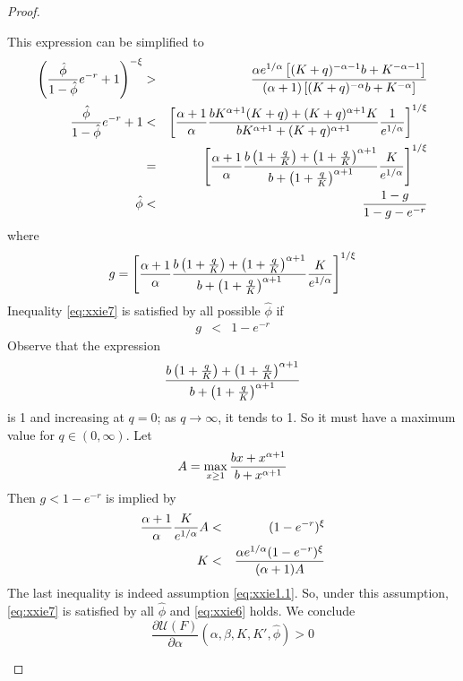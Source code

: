\documentclass{article}
\newcommand{\pd}[2]{
  \frac{\partial #1}{\partial #2}
}
\newcommand{\1}[1]{
  \mathbf{1}_{\{#1\}}
}
\begin{document}
\begin{proof}
\begin{enumerate}[i.]
    This expression can be simplified to
    \begin{eqnarray}
      \left(
           {\hat\phi \over 1 - \hat\phi} e^{-r} + 1
      \right)^{-\xi} &>&
      {
        \alpha e^{1/\alpha} \left[
          (K + q)^{-\alpha - 1} b + K^{-\alpha - 1}
        \right]
        \over
        (\alpha + 1) \left[
          (K + q)^{-\alpha} b + K^{-\alpha}
        \right]
      } \nonumber \\
      {\hat\phi \over 1 - \hat\phi}e^{-r} + 1
      &<&
      \left[
        {\alpha + 1 \over \alpha}
        {
          b K^{\alpha + 1} (K + q)
          + (K + q)^{\alpha + 1} K 
          \over
          b K^{\alpha + 1} + (K + q)^{\alpha + 1}
        } {
          1
          \over
          e^{1/\alpha}
        }
     \right]^{1/\xi} \nonumber \\
      &=&
      \left[
        {\alpha + 1 \over \alpha}
        {
          b \left(1 + {q \over K}\right)
          + \left(1 + {q \over K}\right)^{\alpha + 1}
          \over
          b + \left(1 + {q \over K}\right)^{\alpha + 1}
        } {
          K
          \over
          e^{1/\alpha}
        }
      \right]^{1/\xi} \nonumber \\
      \hat\phi &<& {1 - g \over 1 - g - e^{-r}}
      \label{eq:xxie7}
    \end{eqnarray}
    where
    \[
    g = 
    \left[
      {\alpha + 1 \over \alpha}
      {
        b \left(1 + {q \over K}\right)
        + \left(1 + {q \over K}\right)^{\alpha + 1}
        \over
        b + \left(1 + {q \over K}\right)^{\alpha + 1}
      } {
        K
        \over
        e^{1/\alpha}
      }
      \right]^{1/\xi}
    \]
    Inequality \eqref{eq:xxie7} is satisfied by all possible
    $\hat\phi$ if
    \begin{eqnarray*}
      g &<& 1 - e^{-r}
    \end{eqnarray*}
    Observe that the expression
    \[
    {
      b \left(1 + {q \over K}\right)
      + \left(1 + {q \over K}\right)^{\alpha + 1}
      \over
      b + \left(1 + {q \over K}\right)^{\alpha + 1}
    }
    \]
    is 1 and increasing at $q = 0$; as $q \to \infty$, it tends to
    1. So it must have a maximum value for
    $q \in (0, \infty)$. Let
    \[
    A = \max_{x \geq 1} {b x + x^{\alpha + 1} \over b + x^{\alpha + 1}}
    \]
    Then $g < 1 - e^{-r}$ is implied by
    \begin{eqnarray*}
      {\alpha + 1 \over \alpha}
      {K \over e^{1/\alpha}}
      A &<& (1 - e^{-r})^\xi \\
      K &<& {
        \alpha e^{1/\alpha} (1 - e^{-r})^\xi
        \over
        (\alpha + 1) A
      }
    \end{eqnarray*}
    The last inequality is indeed assumption \eqref{eq:xxie1.1}.
    So, under this assumption, \eqref{eq:xxie7} is satisfied by all
    $\hat\phi$ and \eqref{eq:xxie6} holds. We conclude
    \[
    \pd{\mathcal U(F)}{\alpha}(\alpha, \beta, K, K', \hat \phi) > 0
    \]


\end{enumerate}
\end{proof}
\end{document}
